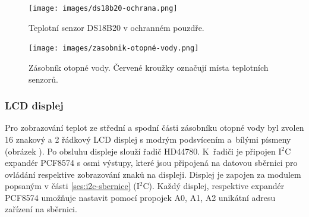 \begin{figure}[H]
    \centering
    \texttt{[image: images/ds18b20-ochrana.png]}
    \caption{Teplotní senzor DS18B20 v ochranném pouzdře.}
    \label{fig:ds18b20-ochrana}
\end{figure}

\begin{figure}[H]
    \centering
    \texttt{[image: images/zasobnik-otopné-vody.png]}
    \caption[Zásobník otopné vody.]{Zásobník otopné vody. Červené kroužky označují místa teplotních senzorů.}
    \label{fig:zasobnik-otopné-vody}
\end{figure}


\subsubsection{LCD displej}
Pro zobrazování teplot ze střední a spodní části zásobníku otopné vody byl zvolen 16 znakový a 2 řádkový LCD displej s modrým podsvícením a~bílými písmeny (obrázek ). Po obsluhu displeje slouží řadič HD44780. K~řadiči je připojen I$^2$C expandér PCF8574 s osmi výstupy, které jsou připojená na datovou sběrnici pro ovládání respektive zobrazování znaků na displeji. Displej je zapojen za modulem popsaným v části \ref{ses:i2c-sbernice} (I$^2$C). Každý displej, respektive expandér PCF8574 umožňuje nastavit pomocí propojek A0, A1, A2 unikátní adresu zařízení na sběrnici.

